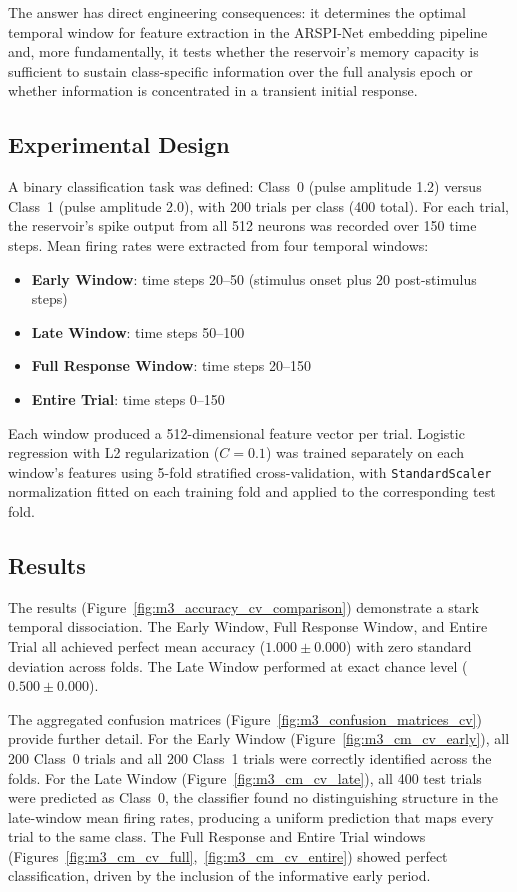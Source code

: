 The answer has direct engineering consequences: it determines the optimal temporal window for feature extraction in the ARSPI-Net embedding pipeline and, more fundamentally, it tests whether the reservoir's memory capacity is sufficient to sustain class-specific information over the full analysis epoch or whether information is concentrated in a transient initial response.

\subsection{Experimental Design}

A binary classification task was defined: Class~0 (pulse amplitude 1.2) versus Class~1 (pulse amplitude 2.0), with 200 trials per class (400 total). For each trial, the reservoir's spike output from all 512 neurons was recorded over 150 time steps. Mean firing rates were extracted from four temporal windows:
\begin{itemize}
    \item \textbf{Early Window}: time steps 20--50 (stimulus onset plus 20 post-stimulus steps)
    \item \textbf{Late Window}: time steps 50--100
    \item \textbf{Full Response Window}: time steps 20--150
    \item \textbf{Entire Trial}: time steps 0--150
\end{itemize}
Each window produced a 512-dimensional feature vector per trial. Logistic regression with L2 regularization ($C = 0.1$) was trained separately on each window's features using 5-fold stratified cross-validation, with \texttt{StandardScaler} normalization fitted on each training fold and applied to the corresponding test fold.

\subsection{Results}

The results (Figure~\ref{fig:m3_accuracy_cv_comparison}) demonstrate a stark temporal dissociation. The Early Window, Full Response Window, and Entire Trial all achieved perfect mean accuracy ($1.000 \pm 0.000$) with zero standard deviation across folds. The Late Window performed at exact chance level ($0.500 \pm 0.000$).

The aggregated confusion matrices (Figure~\ref{fig:m3_confusion_matrices_cv}) provide further detail. For the Early Window (Figure~\ref{fig:m3_cm_cv_early}), all 200 Class~0 trials and all 200 Class~1 trials were correctly identified across the folds. For the Late Window (Figure~\ref{fig:m3_cm_cv_late}), all 400 test trials were predicted as Class~0, the classifier found no distinguishing structure in the late-window mean firing rates, producing a uniform prediction that maps every trial to the same class. The Full Response and Entire Trial windows (Figures~\ref{fig:m3_cm_cv_full},~\ref{fig:m3_cm_cv_entire}) showed perfect classification, driven by the inclusion of the informative early period.

